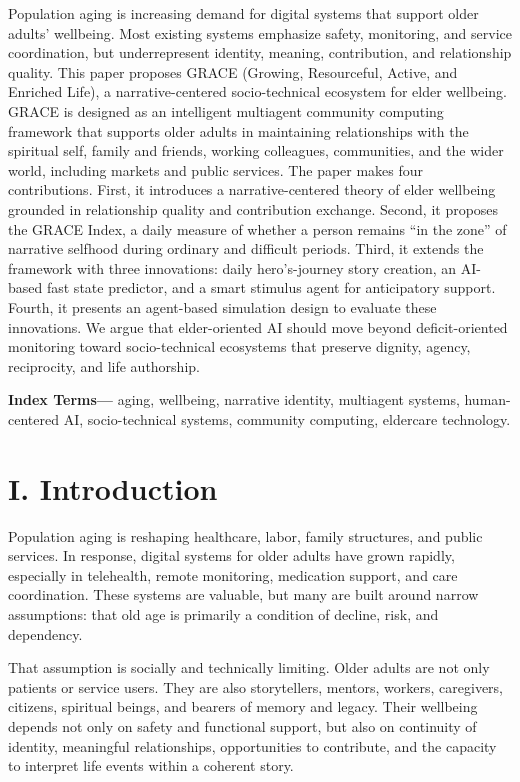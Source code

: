 \documentclass[
  journal,
]{IEEEtran}%
\begin{document}
Population aging is increasing demand for digital systems that support
older adults' wellbeing. Most existing systems emphasize safety,
monitoring, and service coordination, but underrepresent identity,
meaning, contribution, and relationship quality. This paper proposes
GRACE (Growing, Resourceful, Active, and Enriched Life), a
narrative-centered socio-technical ecosystem for elder wellbeing. GRACE
is designed as an intelligent multiagent community computing framework
that supports older adults in maintaining relationships with the
spiritual self, family and friends, working colleagues, communities, and
the wider world, including markets and public services. The paper makes
four contributions. First, it introduces a narrative-centered theory of
elder wellbeing grounded in relationship quality and contribution
exchange. Second, it proposes the GRACE Index, a daily measure of
whether a person remains ``in the zone'' of narrative selfhood during
ordinary and difficult periods. Third, it extends the framework with
three innovations: daily hero's-journey story creation, an AI-based fast
state predictor, and a smart stimulus agent for anticipatory support.
Fourth, it presents an agent-based simulation design to evaluate these
innovations. We argue that elder-oriented AI should move beyond
deficit-oriented monitoring toward socio-technical ecosystems that
preserve dignity, agency, reciprocity, and life authorship.

\textbf{Index Terms---} aging, wellbeing, narrative identity, multiagent
systems, human-centered AI, socio-technical systems, community
computing, eldercare technology.

\section{I. Introduction}\label{i.-introduction}

Population aging is reshaping healthcare, labor, family structures, and
public services. In response, digital systems for older adults have
grown rapidly, especially in telehealth, remote monitoring, medication
support, and care coordination. These systems are valuable, but many are
built around narrow assumptions: that old age is primarily a condition
of decline, risk, and dependency.

That assumption is socially and technically limiting. Older adults are
not only patients or service users. They are also storytellers, mentors,
workers, caregivers, citizens, spiritual beings, and bearers of memory
and legacy. Their wellbeing depends not only on safety and functional
support, but also on continuity of identity, meaningful relationships,
opportunities to contribute, and the capacity to interpret life events
within a coherent story.
\end{document}
